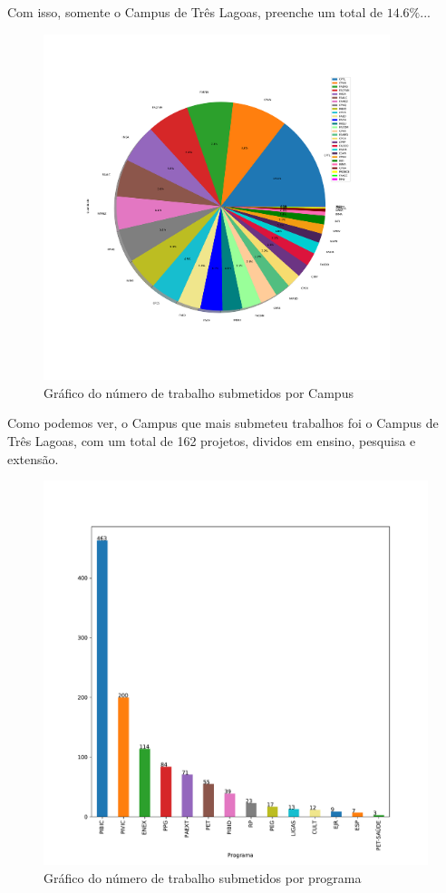 \documentclass[a4paper, 12pt]{article}
\begin{document}
Com isso, somente o Campus de Três Lagoas, preenche um total de $14.6\%$...
\begin{figure}[h]
	\centering
	\includegraphics[width=0.9\textwidth]{../img/unidade_pie.pdf}
	\caption{Gráfico do número de trabalho submetidos por Campus}
	\label{}
\end{figure}
\newpage

Como podemos ver, o Campus que mais submeteu trabalhos foi o Campus de Três Lagoas, com um total de 162 projetos, dividos em ensino, pesquisa e extensão.
\vspace{-30pt}
\begin{figure}[h]
	\centering
	\includegraphics[width=1\textwidth]{../img/programa_bar.pdf}
	\caption{Gráfico do número de trabalho submetidos por programa}
	\label{}
\end{figure}
\newpage
\end{document}
